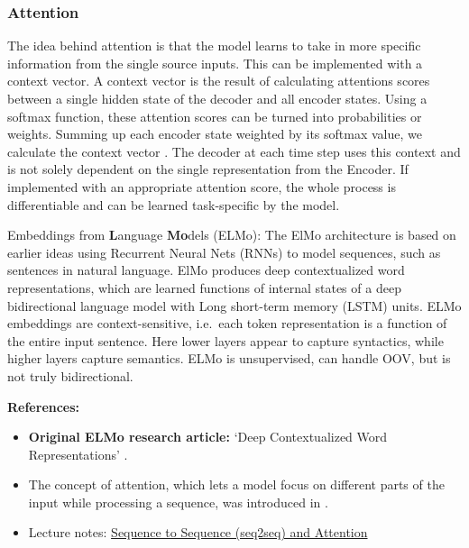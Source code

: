 \documentclass[11pt, a4paper]{amsart}
\begin{document}
\subsubsection{Attention}

The idea behind attention is that the model learns to take in more specific information from the single source inputs. 
This can be implemented with a context vector. 
A context vector is the result of calculating attentions scores between a single hidden state of the decoder and all encoder states. 
Using a softmax function, these attention scores can be turned into probabilities or weights. 
Summing up each encoder state weighted by its softmax value, we calculate the context vector \cite{DBLP:journals/corr/BahdanauCB14}.
The decoder at each time step uses this context and is not solely dependent on the single representation from the Encoder. 
If implemented with an appropriate attention score, the whole process is differentiable and can be learned task-specific by the model.

{
\color{blue}

{E}mbeddings from \textbf{L}anguage \textbf{Mo}dels (ELMo):
The ElMo architecture is based on earlier ideas using Recurrent Neural Nets (RNNs) to model sequences, such as sentences in natural language.
ElMo produces deep contextualized word representations, which are learned functions of internal states of a deep bidirectional language model with Long short-term memory (LSTM) units.
ELMo embeddings are context-sensitive, i.e.\ each token representation is a function of the entire input sentence.
Here lower layers appear to capture syntactics, while higher layers capture semantics.
ELMo is unsupervised, can handle OOV, but is not truly bidirectional.
} %

\noindent \textbf{References:}
\begin{itemize}
	\item \textbf{Original ELMo research article:} `Deep Contextualized Word Representations' \cite{DBLP:journals/corr/abs-1802-05365}.
	\item The concept of attention, which lets a model focus on different parts of the input while processing a sequence, was introduced in \cite{garg-etal-2019-jointly}.
	\item Lecture notes: \href{https://lena-voita.github.io/nlp_course/seq2seq_and_attention.html}{Sequence to Sequence (seq2seq) and Attention}
\end{itemize}

\end{document}
